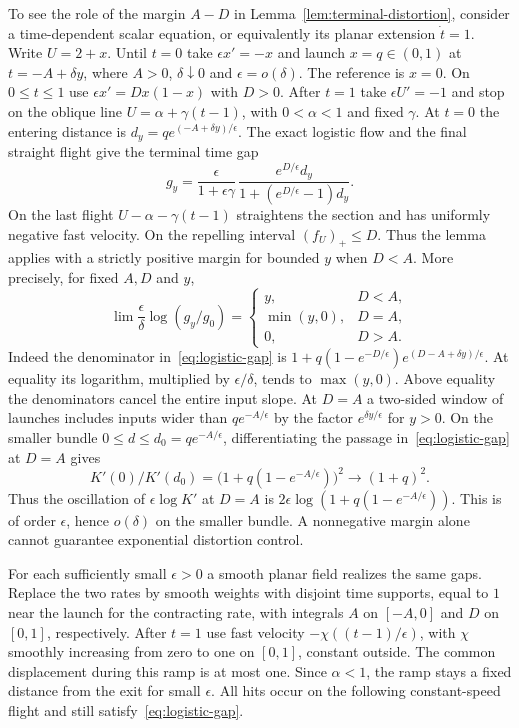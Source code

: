 \begin{example}\label{ex:repelling}
To see the role of the margin $A-D$ in Lemma~\ref{lem:terminal-distortion},
consider a time-dependent scalar equation, or equivalently its planar
extension $\dot t=1$. Write $U=2+x$. Until $t=0$ take
$\epsilon x'=-x$ and launch $x=q\in(0,1)$ at $t=-A+\delta y$,
where $A>0$, $\delta\downarrow0$ and $\epsilon=o(\delta)$.
The reference is $x=0$. On $0\le t\le1$ use
$\epsilon x'=D x(1-x)$ with $D>0$. After $t=1$ take
$\epsilon U'=-1$ and stop on the oblique line $U=\alpha+\gamma(t-1)$,
with $0<\alpha<1$ and fixed $\gamma$. At $t=0$ the entering
distance is $d_y=q e^{(-A+\delta y)/\epsilon}$. The exact logistic
flow and the final straight flight give the terminal time gap
\begin{equation}\label{eq:logistic-gap}
 g_y=\frac{\epsilon}{1+\epsilon\gamma}\,
        \frac{e^{D/\epsilon}d_y}{1+(e^{D/\epsilon}-1)d_y}.
\end{equation}
On the last flight $U-\alpha-\gamma(t-1)$ straightens the section and
has uniformly negative fast velocity. On the repelling interval
$(f_U)_+\le D$. Thus the lemma applies with a strictly positive
margin for bounded $y$ when $D<A$.
More precisely, for fixed $A,D$ and $y$,
\[
 \lim\frac{\epsilon}{\delta}\log(g_y/g_0)=
 \begin{cases}
 y,&D<A,\\
 \min(y,0),&D=A,\\
 0,&D>A .
 \end{cases}
\]
Indeed the denominator in~\eqref{eq:logistic-gap} is
$1+q(1-e^{-D/\epsilon})e^{(D-A+\delta y)/\epsilon}$.
At equality its logarithm, multiplied by $\epsilon/\delta$, tends to
$\max(y,0)$. Above equality the denominators cancel the entire input
slope. At $D=A$ a two-sided window of launches includes inputs wider
than $q e^{-A/\epsilon}$ by the factor $e^{\delta y/\epsilon}$ for $y>0$.
On the smaller bundle $0\le d\le d_0=q e^{-A/\epsilon}$, differentiating
the passage in~\eqref{eq:logistic-gap} at $D=A$ gives
\[
  K'(0)/K'(d_0)=\big(1+q(1-e^{-A/\epsilon})\big)^2
       \longrightarrow(1+q)^2.
\]
Thus the oscillation of
$\epsilon\log K'$ at $D=A$ is
$2\epsilon\log(1+q(1-e^{-A/\epsilon}))$. This is of order $\epsilon$,
hence $o(\delta)$ on the smaller bundle. A nonnegative margin alone
cannot guarantee exponential distortion control.

For each sufficiently small $\epsilon>0$ a smooth planar field realizes
the same gaps. Replace the two rates by
smooth weights with disjoint time supports, equal to $1$ near the
launch for the contracting rate, with integrals $A$ on $[-A,0]$
and $D$ on $[0,1]$, respectively. After $t=1$ use fast velocity
$-\chi((t-1)/\epsilon)$, with $\chi$ smoothly increasing from zero
to one on $[0,1]$, constant outside. The common displacement during
this ramp is at most one. Since $\alpha<1$, the ramp stays a fixed
distance from the exit for small $\epsilon$. All hits occur on the
following constant-speed flight and still satisfy~\eqref{eq:logistic-gap}.
\end{example}
